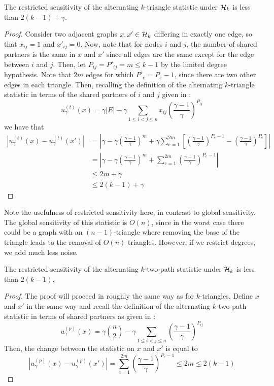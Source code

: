 \begin{claim}
The restricted sensitivity of the alternating $k$-triangle statistic under $\mathcal{H}_k$ is less than $2(k-1) + \gamma$.
\end{claim}
\begin{proof}
Consider two adjacent graphs $x, x'\in \mathcal{H}_k$ differing in exactly one edge, so that $x_{ij} = 1$ and $x'_{ij} = 0$. Now, note that for nodes $i$ and $j$, the number of shared partners is the same in $x$ and $x'$ since all edges are the same except for the edge between $i$ and $j$. Then, let $P_{ij} = P'_{ij} = m \leq k-1$ by the limited degree hypothesis. Note that $2m$ edges for which $P'_{e} = P_{e} - 1$, since there are two other edges in each triangle. Then, recalling the definition of the alternating $k$-triangle statistic in terms of the shared partners of $i$ and $j$ given in :
$$
u_\gamma^{(t)}(x) = \gamma |E| - \gamma \sum_{1 \leq i < j \leq n} x_{ij} \left(\frac{\gamma-1}{\gamma} \right)^{P_{ij}}
$$
we have that 
\begin{align*}
|u_\gamma^{(t)}(x) - u_\gamma^{(t)}(x')| &= \left|\gamma - \gamma \left(\frac{\gamma-1}{\gamma} \right)^{m}  + \gamma\sum_{e= 1}^{2m}  \left[\left(\frac{\gamma-1}{\gamma} \right)^{P_e-1}  - \left(\frac{\gamma-1}{\gamma} \right)^{P_e}\right]    \right|\\
& = \left|\gamma - \gamma \left(\frac{\gamma-1}{\gamma} \right)^{m}  + \sum_{e= 1}^{2m}  \left(\frac{\gamma-1}{\gamma} \right)^{P_e-1}   \right|\\
& \leq 2m + \gamma\\ 
& \leq 2(k-1) + \gamma 
\end{align*}
\end{proof}

Note the usefulness of restricted sensitivity here, in contrast to global sensitivity. The global sensitivity of this statistic is $O(n)$, since in the worst case there could be a graph with an $(n-1)$-triangle where removing the base of the triangle leads to the removal of $O(n)$ triangles. However, if we restrict degrees, we add much less noise.

\begin{claim}
The restricted sensitivity of the alternating $k$-two-path statistic under $\mathcal{H}_k$ is less than $2(k-1)$.
\end{claim}
\begin{proof}
The proof will proceed in roughly the same way as for $k$-triangles. Define $x$ and $x'$ in the same way and recall the definition of the alternating $k$-two-path statistic in terms of shared partners as given in :
$$
u_\gamma^{(p)}(x) = \gamma \binom{n}{2} - \gamma \sum_{1 \leq i < j \leq n} \left(\frac{\gamma-1}{\gamma} \right)^{P_{ij}}
$$
Then, the change between the statistic on $x$ and $x'$ is equal to 
$$|u_\gamma^{(p)}(x) -  u_\gamma^{(p)}(x')| = \sum_{e = 1}^{2m} \left( \frac{\gamma - 1}{\gamma} \right)^{P_e - 1} \leq 2m \leq 2(k-1)$$
\end{proof}

